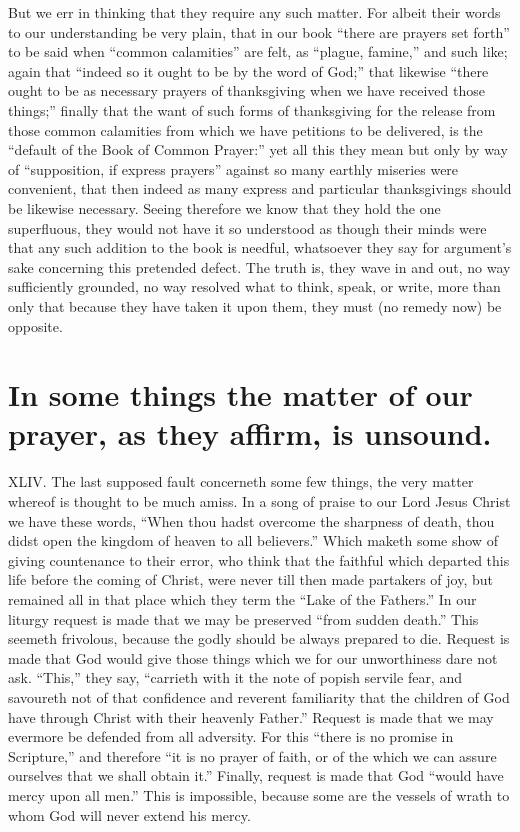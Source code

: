 But we err in thinking that they require any such matter. For albeit their words to our understanding be very plain, that in our book “there are prayers set forth” to be said when “common calamities” are felt, as “plague, famine,” and such like; again that “indeed so it ought to be by the word of God;” that likewise “there ought to be as necessary prayers of thanksgiving when we have received those things;” finally that the want of such forms of thanksgiving for the release from those common calamities from which we have petitions to be delivered, is the “default of the Book of Common Prayer:” yet all this they mean but only by way of “supposition, if express prayers” against so many earthly miseries were convenient, that then indeed as many express and particular thanksgivings should be likewise necessary. Seeing therefore we know that they hold the one superfluous, they would not have it so understood as though their minds were that any such addition to the book is needful, whatsoever they say for argument’s sake concerning this pretended defect. The truth is, they wave in and out, no way sufficiently grounded, no way resolved what to think, speak, or write, more than only that because they have taken it upon them, they must (no remedy now) be opposite.

\section*{In some things the matter of our prayer, as they affirm, is unsound.}
XLIV. The last supposed fault concerneth some few things, the very matter whereof is thought to be much amiss. In a song of praise to our Lord Jesus Christ we have these words, “When thou hadst overcome the sharpness of death, thou didst open the kingdom of heaven to all believers.” Which maketh some show of giving countenance to their  error, who think that the faithful which departed this life before the coming of Christ, were never till then made partakers of joy, but remained all in that place which they term the “Lake of the Fathers.”
In our liturgy request is made that we may be preserved “from sudden death.” This seemeth frivolous, because the godly should be always prepared to die.
Request is made that God would give those things which we for our unworthiness dare not ask. “This,” they say, “carrieth with it the note of popish servile fear, and savoureth not of that confidence and reverent familiarity that the children of God have through Christ with their heavenly Father.”
Request is made that we may evermore be defended from all adversity. For this “there is no promise in Scripture,” and therefore “it is no prayer of faith, or of the which we can assure ourselves that we shall obtain it.”
Finally, request is made that God “would have mercy upon all men.” This is impossible, because some are the vessels of wrath to whom God will never extend his mercy.

